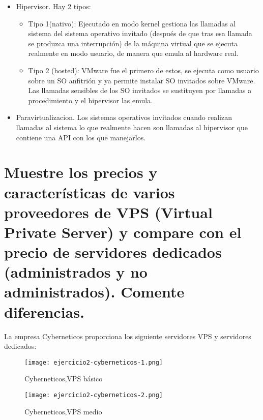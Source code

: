 	\begin{itemize}
		\item Hipervisor. Hay 2 tipos:
		\begin{itemize}
			\item Tipo 1(nativo):
			Ejecutado en\cite{primero} modo kernel gestiona las llamadas al sistema del sistema operativo invitado (después de que tras esa llamada se produzca una interrupción) de la máquina virtual que se ejecuta realmente en modo usuario, de manera que emula al hardware real.
			
			
			
			\item Tipo 2 (hosted): VMware fue el primero de estos, se ejecuta como usuario sobre un SO anfitrión y ya permite instalar SO invitados sobre VMware. Las llamadas sensibles de los SO invitados se sustituyen por llamadas a procedimiento y el hipervisor las emula.
		\end{itemize}
		
		\item Paravirtualizacion. Los sistemas operativos invitados cuando realizan llamadas al sistema lo que realmente hacen son llamadas al hipervisor que contiene una API con los que manejarlos.
	\end{itemize}
	
	
	
	\section{Muestre los precios y características de varios proveedores de VPS (Virtual Private Server)  y compare con el precio de servidores dedicados (administrados y no administrados). Comente diferencias.}
	
	
	La empresa Cyberneticos proporciona los siguiente servidores VPS\cite{cincuentaycuatro} y servidores dedicados\cite{cincuentaycinco}:
	
	\begin{figure}[H] 
		\centering
		\texttt{[image: ejercicio2-cyberneticos-1.png]} 
		\label{figura1} 
		
		\caption{Cyberneticos,VPS básico} 
	\end{figure}
	
	\begin{figure}[H] 
		\centering
		\texttt{[image: ejercicio2-cyberneticos-2.png]} 
		\label{figura2} 
		
		\caption{Cyberneticos,VPS medio} 
	\end{figure}
	
